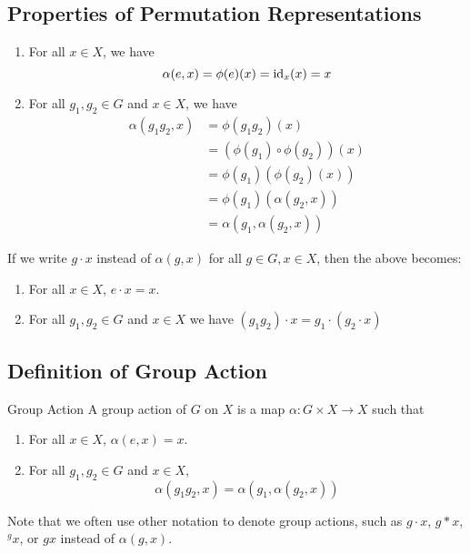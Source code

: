 \documentclass{article}
\begin{document}
\subsection{Properties of Permutation Representations}
\begin{enumerate}
    \item For all $x\in X$, we have
          \begin{equation*}
              \alpha(e,x)=\phi(e)(x)=\text{id}_x(x)=x
          \end{equation*}
    \item For all $g_1,g_2\in G$ and $x\in X$, we have
          \begin{align*}
              \alpha(g_1g_2,x) & = \phi(g_1g_2)(x)              \\
                               & = (\phi(g_1)\circ\phi(g_2))(x) \\
                               & = \phi(g_1)(\phi(g_2)(x))      \\
                               & = \phi(g_1)(\alpha(g_2,x))     \\
                               & =\alpha(g_1,\alpha(g_2,x))
          \end{align*}
\end{enumerate}
If we write $g \cdot x$ instead of $\alpha(g,x)$ for all $g\in G, x\in X$, then the above becomes:
\begin{enumerate}
    \item For all $x\in X$, $e\cdot x = x$.
    \item For all $g_1,g_2\in G$ and $x\in X$ we have $(g_1g_2)\cdot x = g_1 \cdot (g_2 \cdot x)$
\end{enumerate}
\subsection{Definition of Group Action}
\begin{definition}{Group Action}
    A group action of $G$ on $X$ is a map $\alpha: G\times X \rightarrow X$ such that
    \begin{enumerate}
        \item For all $x\in X$, $\alpha(e,x)=x$.
        \item For all $g_1,g_2 \in G$ and $x\in X$,
              \begin{equation*}
                  \alpha(g_1g_2,x)=\alpha(g_1,\alpha(g_2,x))
              \end{equation*}
    \end{enumerate}
\end{definition}
Note that we often use other notation to denote group actions, such as $g\cdot x$, $g*x$, ${}^gx$, or $gx$ instead of $\alpha(g,x)$.
\end{document}
